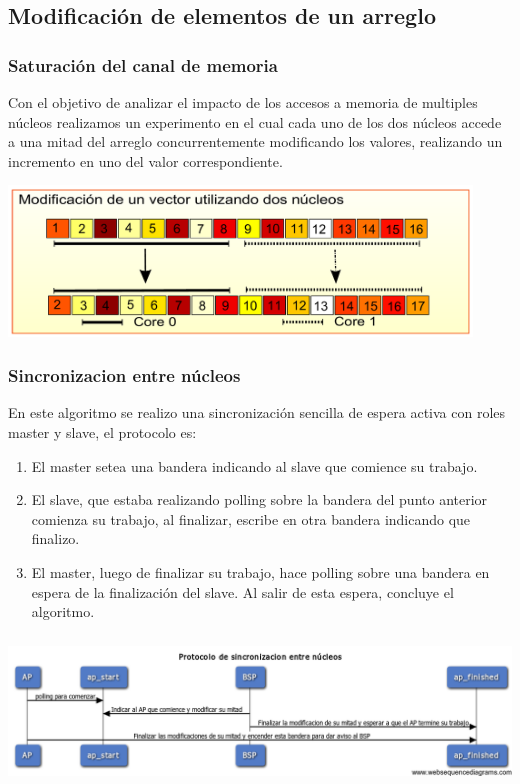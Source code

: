  \subsection{Modificación de elementos de un arreglo}
	\subsubsection{Saturación del canal de memoria}
		Con el objetivo de analizar el impacto de los accesos a memoria de multiples núcleos realizamos un experimento en el cual cada uno de los dos núcleos accede a una mitad del arreglo concurrentemente modificando los valores, realizando un incremento en uno del valor correspondiente.
		
	\begin{center}
 	    \includegraphics[height=4cm]{images/dualcore-vectorsum.pdf}
    \end{center}

	\subsubsection{Sincronizacion entre núcleos}
		En este algoritmo se realizo una sincronización sencilla de espera activa con roles master y slave, el protocolo es:
		\begin{enumerate}
			\item El master setea una bandera indicando al slave que comience su trabajo.
			\item El slave, que estaba realizando polling sobre la bandera del punto anterior comienza su trabajo, al finalizar, escribe en otra bandera indicando que finalizo.
			\item El master, luego de finalizar su trabajo, hace polling sobre una bandera en espera de la finalización del slave. Al salir de esta espera, concluye el algoritmo.
		\end{enumerate}
		
		\begin{center}
 	       \includegraphics[height=4cm]{images/sync-vectorsum-seq.png}
    	\end{center}

